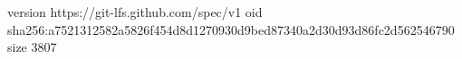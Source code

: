 version https://git-lfs.github.com/spec/v1
oid sha256:a7521312582a5826f454d8d1270930d9bed87340a2d30d93d86fc2d562546790
size 3807
